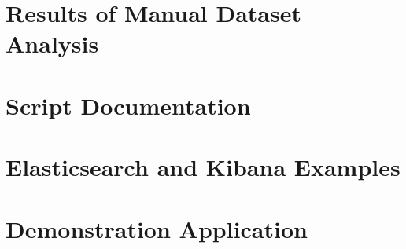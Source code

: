 \documentclass[english,BP]{thesiskiv}
\begin{document}
\appendix

\chapter{Results of Manual Dataset Analysis}\label{manual_analysis}


\chapter{Script Documentation}


\chapter{Elasticsearch and Kibana Examples}


\chapter{Demonstration Application}\label{demo_app}

\end{document}
